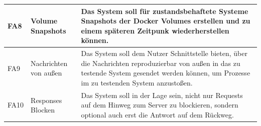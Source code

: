 \documentclass[12pt,a4paper]{report}
\begin{document}
\begin{table}[h]
\begin{tabular}{|l|l|p{7cm}|}
		FA8  & Volume Snapshots              & Das System soll für zustandsbehaftete Systeme Snapshots der Docker Volumes erstellen und zu einem späteren Zeitpunk wiederherstellen können.                                                                          \\ \hline
		FA9  & Nachrichten von außen         & Das System soll dem Nutzer Schnittstelle bieten, über die Nachrichten reproduzierbar von außen in das zu testende System gesendet werden können, um Prozesse im zu testenden System anzustoßen.                       \\ \hline
		FA10 & Responses Blocken             & Das System soll in der Lage sein, nicht nur Requests auf dem Hinweg zum Server zu blockieren, sondern optional auch erst die Antwort auf dem Rückweg.                                                                 \\ \hline
	\end{tabular}
\end{table}
\end{document}
